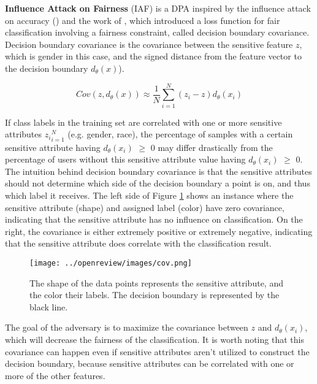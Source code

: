 \textbf{Influence Attack on Fairness} (IAF)
is a DPA inspired by the influence attack on accuracy (\cite{koh2017understanding}) and the work of \cite{zafar2015learning}, which introduced a loss function for fair classification involving a fairness constraint, called decision boundary covariance.
Decision boundary covariance is the covariance between the sensitive feature $z$, which is gender in this case, and the signed distance from the feature vector to the decision boundary $d_{\theta}(x)$).

\begin{equation}
    Cov(z, d_{\theta}(x)) \approx \frac{1}{N}\sum^N_{i=1}(z_i -z)d_{\theta}(x_i)
\end{equation}


If class labels in the training set are correlated with one or more sensitive attributes ${z_i}^N_{i=1}$ (e.g. gender, race), the percentage of samples with a certain sensitive attribute having $d_{\theta}(x_i)$ $\geq$ 0 may differ drastically from the percentage of users without this sensitive attribute value having $d_{\theta}(x_i)$ $\geq$ 0.
The intuition behind decision boundary covariance is that the sensitive attributes should not determine which side of the decision boundary a point is on, and thus which label it receives. 
The left side of Figure \ref{influence_visual} shows an instance where the sensitive attribute (shape) and assigned label (color) have zero covariance, indicating that the sensitive attribute has no influence on classification. On the right, the covariance is either extremely positive or extremely negative, indicating that the sensitive attribute does correlate with the classification result.

\begin{figure}
\centering
\texttt{[image: ../openreview/images/cov.png]}
\caption{The shape of the data points represents the sensitive attribute, and the color their labels. The decision boundary is represented by the black line.}
\label{influence_visual}
\end{figure}

The goal of the adversary is to maximize the covariance between $z$ and $d_{\theta} (x_i)$, which will decrease the fairness of the classification.
It is worth noting that this covariance can happen even if sensitive attributes aren't utilized to construct the decision boundary, because sensitive attributes can be correlated with one or more of the other features.

